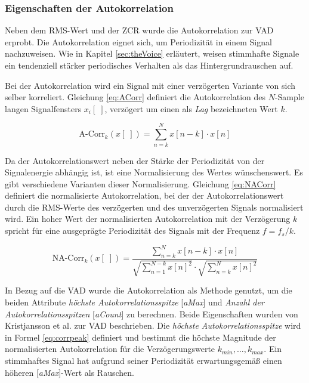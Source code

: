 \subsubsection{Eigenschaften der Autokorrelation}

Neben dem RMS-Wert und der ZCR wurde die Autokorrelation zur VAD erprobt. Die Autokorrelation eignet sich, um Periodizität in einem Signal nachzuweisen. Wie in Kapitel \ref{sec:theVoice} erläutert, weisen stimmhafte Signale ein tendenziell stärker periodisches Verhalten als das Hintergrundrauschen auf. 

Bei der Autokorrelation wird ein Signal mit einer verzögerten Variante von sich selber korreliert. Gleichung \ref{eq:ACorr} definiert die Autokorrelation des $N$-Sample langen Signalfensters $x_i[\;]$, verzögert um einen als \emph{Lag} bezeichneten Wert $k$.

\begin{equation}
\text{A-Corr}_k(x[\;]) = \sum_{n=k}^{N} x[n-k] \cdot x[n]
\label{eq:ACorr}
\end{equation}

Da der Autokorrelationswert neben der Stärke der Periodizität von der Signalenergie abhängig ist, ist eine Normalisierung des Wertes wünschenswert. Es gibt verschiedene Varianten dieser Normalisierung. Gleichung \ref{eq:NACorr} definiert die \glqq normalisierte Autokorrelation\grqq{}, bei der der Autokorrelationswert durch die RMS-Werte des verzögerten und des unverzögerten Signals normalisiert wird. Ein hoher Wert der normalisierten Autokorrelation mit der Verzögerung $k$ spricht für eine ausgeprägte Periodizität des Signals mit der Frequenz $f =  f_s / k $.\cite{vad_Lisboa}

\begin{equation}
\text{NA-Corr}_k(x[\;]) = \frac{\sum_{n=k}^{N} x[n-k] \cdot x[n]}{ \sqrt{\sum_{n=1}^{N-k}  x[n]^2}  \cdot  \sqrt{\sum_{n=k}^{N}  x[n]^2} }
\label{eq:NACorr}
\end{equation}



In Bezug auf die VAD wurde die Autokorrelation als Methode genutzt, um die beiden Attribute \emph{höchste Autokorrelationsspitze} [\emph{aMax}] und \emph{Anzahl der Autokorrelationsspitzen} [\emph{aCount}] zu berechnen. Beide Eigenschaften wurden von Kristjansson et al. \cite[S. 1 - 2]{vad_Lisboa} zur VAD beschrieben. Die \emph{höchste Autokorrelationsspitze} wird in Formel \ref{eq:corrpeak} definiert und bestimmt die höchste Magnitude der normalisierten Autokorrelation für die Verzögerungswerte $k_{min} , \ldots , k_{max}$. Ein stimmhaftes Signal hat aufgrund seiner Periodizität erwartungsgemäß einen höheren [\emph{aMax}]-Wert als Rauschen.

